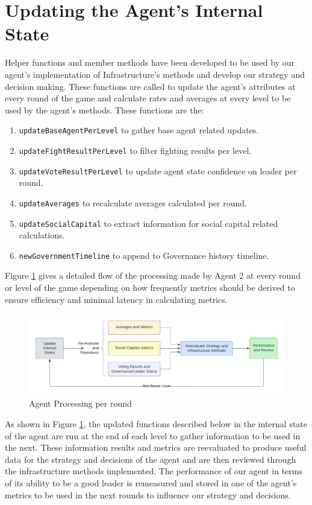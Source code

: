 \section{Updating the Agent's Internal State}
Helper functions and member methods have been developed to be used by our agent's implementation of Infrastructure's methods and develop our strategy and decision making. These functions are called to update the agent's attributes at every round of the game and calculate rates and averages at every level to be used by the agent's methods. These functions are the:
\begin{enumerate}
    \item \verb|updateBaseAgentPerLevel| to gather base agent related updates.
    \item \verb|updateFightResultPerLevel| to filter fighting results per level.
    \item \verb|updateVoteResultPerLevel| to update agent state confidence on leader per round.
    \item \verb|updateAverages| to recalculate averages calculated per round.
    \item \verb|updateSocialCapital| to extract information for social capital related calculations.
    \item \verb|newGovernmentTimeline| to append to Governance history timeline.
\end{enumerate}

Figure \ref{fig:Process} gives a detailed flow of the processing made by Agent 2 at every round or level of the game depending on how frequently metrics should be derived to ensure efficiency and minimal latency in calculating metrics.

\begin{figure}[!ht]
    \centering
    \includegraphics[width=0.8\linewidth]{005_team_2_agent_design/Resources/process.png}
    \caption{Agent Processing per round}
    \label{fig:Process}
\end{figure}

As shown in Figure \ref{fig:Process}, the updated functions described below in the internal state of the agent are run at the end of each level to gather information to be used in the next. These information results and metrics are reevaluated to produce useful data for the strategy and decisions of the agent and are then reviewed through the infrastructure methods implemented. The performance of our agent in terms of its ability to be a good leader is remeasured and stored in one of the agent's metrics to be used in the next rounds to influence our strategy and decisions.

